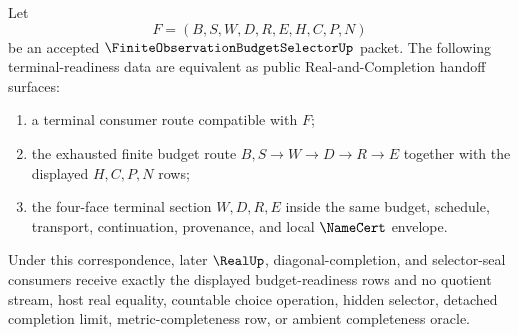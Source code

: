\begin{theorem}
\label{thm:finite-observation-budget-selector-terminal-readiness-correspondence}
Let
$$
F=(B,S,W,D,R,E,H,C,P,N)
$$
be an accepted $\FiniteObservationBudgetSelectorUp$ packet. The following terminal-readiness data are equivalent as public Real-and-Completion handoff surfaces:
\begin{enumerate}
\item a terminal consumer route compatible with $F$;
\item the exhausted finite budget route $B,S \to W \to D \to R \to E$ together with the displayed $H,C,P,N$ rows;
\item the four-face terminal section $W,D,R,E$ inside the same budget, schedule, transport, continuation, provenance, and local $\NameCert$ envelope.
\end{enumerate}
Under this correspondence, later $\RealUp$, diagonal-completion, and selector-seal consumers receive exactly the displayed budget-readiness rows and no quotient stream, host real equality, countable choice operation, hidden selector, detached completion limit, metric-completeness row, or ambient completeness oracle.
\end{theorem}
